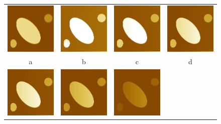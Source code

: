 \documentclass{procDDs}
\begin{document}
\begin{figure}[h!]\center%
	\begin{tabular}{cccc}
		\includegraphics[width=0.2\linewidth]{img/6/1.jpg}&
		\includegraphics[width=0.2\linewidth]{img/6/3.jpg}&
		\includegraphics[width=0.2\linewidth]{img/6/4.jpg}&
		\includegraphics[width=0.2\linewidth]{img/6/5.jpg}\\
		a & b & c & d \\
		\includegraphics[width=0.2\linewidth]{img/6/5.jpg}&
		\includegraphics[width=0.2\linewidth]{img/6/6.jpg}&
		\includegraphics[width=0.2\linewidth]{img/6/9.jpg}&

\end{tabular}
\end{figure}
\end{document}
